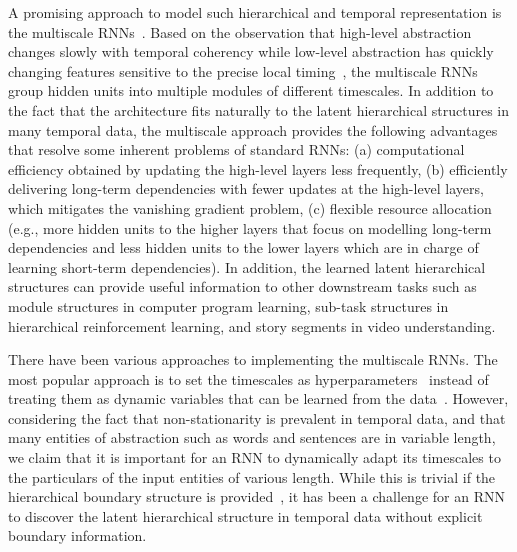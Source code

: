 A promising approach to model such hierarchical and temporal representation is the multiscale RNNs~\citep{schmidhuber1992learning,el1995hierarchical,koutnik2014clockwork}. Based on the observation that high-level abstraction changes slowly with temporal coherency while low-level abstraction has quickly changing features sensitive to the precise local timing~\citep{el1995hierarchical}, the multiscale RNNs group hidden units into multiple modules of different timescales. In addition to the fact that the architecture fits naturally to the latent hierarchical structures in many temporal data, the multiscale approach provides the following advantages that resolve some inherent problems of standard RNNs: (a) computational efficiency obtained by updating the high-level layers less frequently, (b) efficiently delivering long-term dependencies with fewer updates at the high-level layers, which mitigates the vanishing gradient problem, (c) flexible resource allocation (e.g., more hidden units to the higher layers that focus on modelling long-term dependencies and less hidden units to the lower layers which are in charge of learning short-term dependencies). In addition, the learned latent hierarchical structures can provide useful information to other downstream tasks such as module structures in computer program learning, sub-task structures in hierarchical reinforcement learning, and story segments in video understanding.

There have been various approaches to implementing the multiscale RNNs. The most popular approach is to set the timescales as hyperparameters~\citep{el1995hierarchical,koutnik2014clockwork,bahdanau2016end} instead of treating them as dynamic variables that can be learned from the data~\citep{schmidhuber1991neural,schmidhuber1992learning,chung2015gated,chung2016character}. However, considering the fact that non-stationarity is prevalent in temporal data, and that many entities of abstraction such as words and sentences are in variable length, we claim that it is important for an RNN to dynamically adapt its timescales to the particulars of the input entities of various length. While this is trivial if the hierarchical boundary structure is provided~\citep{sordoni2015hierarchical}, it has been a challenge for an RNN to discover the latent hierarchical structure in temporal data without explicit boundary information.  

